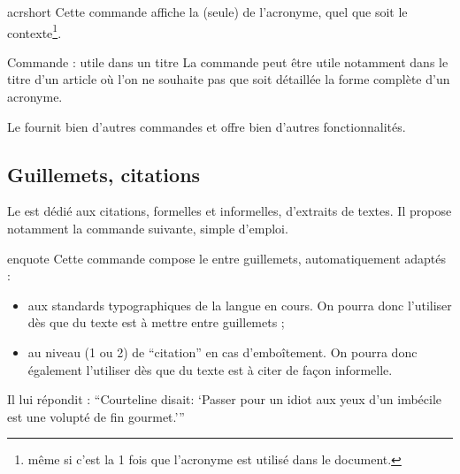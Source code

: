 \documentclass[french,nolocaltoc]{nwejmart}
\newtheorem[title=Fait,style=definition]{fact}
\begin{document}
\begin{docCommand}{acrshort}{}
  Cette commande affiche la  (seule) de l'acronyme, quel que
  soit le contexte\footnote{\Ie*{} même si c'est la 1\iere{} fois que l'acronyme
    est utilisé dans le document.}.
\end{docCommand}

\begin{dbremark}{Commande  : utile dans un titre}{}
  La commande  peut être utile notamment dans le titre d'un
  article où l'on ne souhaite pas que soit détaillée la forme complète d'un
  acronyme.
\end{dbremark}

Le  fournit bien d'autres commandes et offre bien d'autres
fonctionnalités\autocite[Pour plus de détails, cf. par exemple][]{Bitouze7}.

\subsection{Guillemets, citations}
\label{sec-guillemets-citations}

Le  est dédié aux citations, formelles et informelles,
d'extraits de textes. Il propose notamment la commande 
suivante, simple d'emploi.

\begin{docCommand}{enquote}{}
  Cette commande compose le  entre guillemets, automatiquement
  adaptés :
  \begin{itemize}
  \item aux standards typographiques de la langue en cours. On pourra donc
    l'utiliser dès que du texte est à mettre entre guillemets ;
  \item au niveau (1 ou 2) de \enquote{citation} en cas d'emboîtement. On
    pourra donc également l'utiliser dès que du texte est à citer de façon
    informelle.
  \end{itemize}
\begin{bodycode}[listing and text,listing options={alsolanguage={[csquotes]TeX}}]
Il lui répondit : \enquote{Courteline disait: \enquote{Passer
    pour un idiot aux yeux d'un imbécile est une volupté de fin
    gourmet.}}
\end{bodycode}
\end{docCommand}
\end{document}
